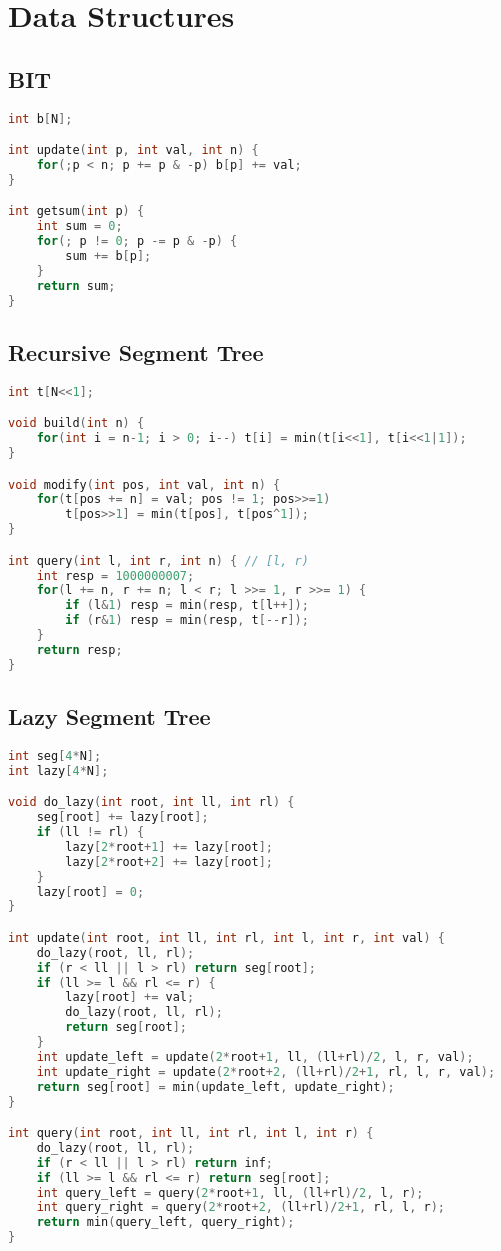 \documentclass{article}
\begin{document}
\section{Data Structures}
\subsection{BIT}
\begin{lstlisting}[language=C++]
int b[N];

int update(int p, int val, int n) {
	for(;p < n; p += p & -p) b[p] += val;
}

int getsum(int p) {
	int sum = 0;
	for(; p != 0; p -= p & -p) {
		sum += b[p];
	}
	return sum;
}
\end{lstlisting}
\subsection{Recursive Segment Tree}
\begin{lstlisting}[language=C++]
int t[N<<1];

void build(int n) {
	for(int i = n-1; i > 0; i--) t[i] = min(t[i<<1], t[i<<1|1]);
}

void modify(int pos, int val, int n) {
	for(t[pos += n] = val; pos != 1; pos>>=1)
		t[pos>>1] = min(t[pos], t[pos^1]);
}

int query(int l, int r, int n) { // [l, r)
	int resp = 1000000007;
	for(l += n, r += n; l < r; l >>= 1, r >>= 1) {
		if (l&1) resp = min(resp, t[l++]);
		if (r&1) resp = min(resp, t[--r]);
	}
	return resp;
}
\end{lstlisting}
\subsection{Lazy Segment Tree}
\begin{lstlisting}[language=C++]
int seg[4*N];
int lazy[4*N];

void do_lazy(int root, int ll, int rl) {
	seg[root] += lazy[root];
	if (ll != rl) {
		lazy[2*root+1] += lazy[root];
		lazy[2*root+2] += lazy[root];
	}
	lazy[root] = 0;
}

int update(int root, int ll, int rl, int l, int r, int val) {
	do_lazy(root, ll, rl);
	if (r < ll || l > rl) return seg[root];
	if (ll >= l && rl <= r) {
		lazy[root] += val;
		do_lazy(root, ll, rl);
		return seg[root];
	}
	int update_left = update(2*root+1, ll, (ll+rl)/2, l, r, val);
	int update_right = update(2*root+2, (ll+rl)/2+1, rl, l, r, val);
	return seg[root] = min(update_left, update_right);
}

int query(int root, int ll, int rl, int l, int r) {
	do_lazy(root, ll, rl);
	if (r < ll || l > rl) return inf;
	if (ll >= l && rl <= r) return seg[root];
	int query_left = query(2*root+1, ll, (ll+rl)/2, l, r);
	int query_right = query(2*root+2, (ll+rl)/2+1, rl, l, r);
	return min(query_left, query_right); 
}
\end{lstlisting}
\end{document}
